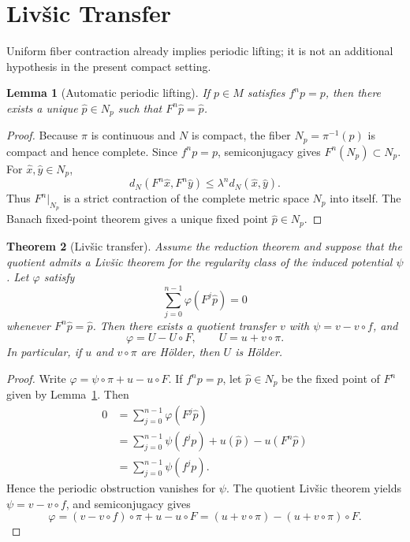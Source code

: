 \documentclass[11pt,a4paper]{article}
\newtheorem{theorem}{Theorem}[section]
\newtheorem{lemma}[theorem]{Lemma}
\begin{document}
\section{Liv\v{s}ic Transfer}

Uniform fiber contraction already implies periodic lifting; it is not an
additional hypothesis in the present compact setting.

\begin{lemma}[Automatic periodic lifting]
\label{lem:periodic-lifting}
If $p\in M$ satisfies $f^np=p$, then there exists a unique
$\hat p\in N_p$ such that $F^n\hat p=\hat p$.
\end{lemma}

\begin{proof}
Because $\pi$ is continuous and $N$ is compact, the fiber
$N_p=\pi^{-1}(p)$ is compact and hence complete. Since
$f^np=p$, semiconjugacy gives $F^n(N_p)\subset N_p$. For
$\hat x,\hat y\in N_p$,
\[
 d_N(F^n\hat x,F^n\hat y)\le\lambda^n d_N(\hat x,\hat y).
\]
Thus $F^n|_{N_p}$ is a strict contraction of the complete metric space
$N_p$ into itself. The Banach fixed-point theorem gives a unique fixed
point $\hat p\in N_p$.
\end{proof}

\begin{theorem}[Liv\v{s}ic transfer]
\label{thm:livsic}
Assume the reduction theorem and suppose that the quotient admits a
Liv\v{s}ic theorem for the regularity class of the induced potential
$\psi$. Let $\varphi$ satisfy
\[
\sum_{j=0}^{n-1}\varphi(F^j\hat p)=0
\]
whenever $F^n\hat p=\hat p$. Then there exists a quotient transfer $v$
with $\psi=v-v\circ f$, and
\[
 \varphi=U-U\circ F,\qquad U=u+v\circ\pi.
\]
In particular, if $u$ and $v\circ\pi$ are H\"older, then $U$ is
H\"older.
\end{theorem}

\begin{proof}
Write $\varphi=\psi\circ\pi+u-u\circ F$. If $f^np=p$, let
$\hat p\in N_p$ be the fixed point of $F^n$ given by
Lemma~\ref{lem:periodic-lifting}. Then
\begin{align*}
0
&=\sum_{j=0}^{n-1}\varphi(F^j\hat p)\\
&=\sum_{j=0}^{n-1}\psi(f^jp)+u(\hat p)-u(F^n\hat p)\\
&=\sum_{j=0}^{n-1}\psi(f^jp).
\end{align*}
Hence the periodic obstruction vanishes for $\psi$. The quotient
Liv\v{s}ic theorem yields $\psi=v-v\circ f$, and semiconjugacy gives
\[
\varphi=(v-v\circ f)\circ\pi+u-u\circ F
=(u+v\circ\pi)-(u+v\circ\pi)\circ F.
\]
\end{proof}
\end{document}
